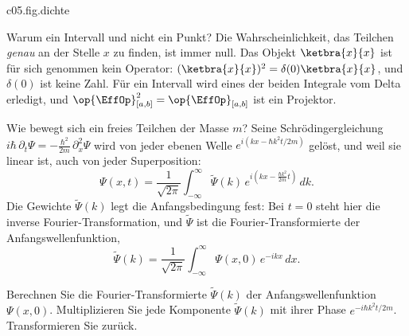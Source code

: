 \begin{tpcfigure}{c05.fig.dichte}
  \caption{Dieselbe Wellenfunktion zweimal: das Gaußsche Wellenpaket
    $\Psi(x) = (2\pi)^{-1/4} e^{-x^2/4} e^{3ix}$. (a) Real- und Imaginärteil wechseln ständig
    ihr Vorzeichen; gepunktet die Einhüllende $\pm\abs{\Psi}$. (b) Vom Faktor $e^{3ix}$ bleibt
    in $p = \abs{\Psi}^2$ nichts übrig. Die Fläche über $[a,b]$ ist die Ansprechwahrscheinlichkeit
    des Detektors $\op{\EffOp}_{[a,b]}$, Gleichung~\eqref{c05.eq.intervall}. Der schmale Streifen
    der Breite $\varepsilon$ bei $c$ ist dieselbe Konstruktion, nur schmaler: Schrumpft
    $\varepsilon$, so schrumpft die Fläche mit.}
\end{tpcfigure}

Warum ein Intervall und nicht ein Punkt? Die Wahrscheinlichkeit, das Teilchen \emph{genau} an
der Stelle $x$ zu finden, ist immer null. Das Objekt $\ketbra{x}{x}$ ist für sich genommen kein
Operator: $(\ketbra{x}{x})^2 = \delta(0)\ketbra{x}{x}$, und $\delta(0)$ ist keine Zahl. Für
ein Intervall wird eines der beiden Integrale vom Delta erledigt, und
$\op{\EffOp}_{[a,b]}^2 = \op{\EffOp}_{[a,b]}$ ist ein Projektor.

Wie bewegt sich ein freies Teilchen der Masse $m$? Seine Schrödingergleichung
$i\hbar\,\partial_t\Psi = -\frac{\hbar^2}{2m}\,\partial_x^2\Psi$ wird von jeder ebenen Welle
$e^{i(kx - \hbar k^2 t/2m)}$ gelöst, und weil sie linear ist, auch von jeder Superposition:
\begin{equation}\label{c05.eq.freieloesung}
  \Psi(x,t) = \frac{1}{\sqrt{2\pi}}\int_{-\infty}^{\infty} \widetilde{\Psi}(k)\,
  e^{i\left(kx-\frac{\hbar k^2}{2m}t\right)}\,dk .
\end{equation}
Die Gewichte $\widetilde{\Psi}(k)$ legt die Anfangsbedingung fest: Bei $t = 0$ steht hier die
inverse Fourier-Transformation, und $\widetilde{\Psi}$ ist die Fourier-Transformierte der
Anfangswellenfunktion,
\begin{equation}\label{c05.eq.phik}
  \widetilde{\Psi}(k) = \frac{1}{\sqrt{2\pi}}\int_{-\infty}^{\infty} \Psi(x,0)\,e^{-ikx}\,dx .
\end{equation}

\begin{merksatz}
  Berechnen Sie die Fourier-Transformierte $\widetilde{\Psi}(k)$ der Anfangswellenfunktion
  $\Psi(x,0)$. Multiplizieren Sie jede Komponente $\widetilde{\Psi}(k)$ mit ihrer Phase
  $e^{-i\hbar k^2t/2m}$. Transformieren Sie zurück.
\end{merksatz}

